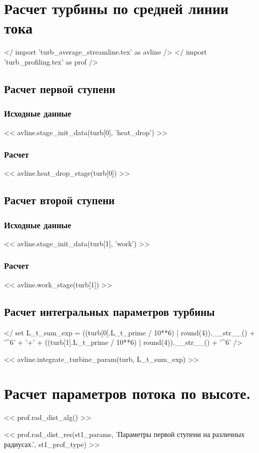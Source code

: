 \documentclass[a4paper,10pt]{article}
\begin{document}
    \section{Расчет турбины по средней линии тока}

    </ import 'turb_average_streamline.tex' as avline />
    </ import 'turb_profiling.tex' as prof />

    \subsection{Расчет первой ступени}

    \subsubsection{Исходные данные}

    << avline.stage_init_data(turb[0], 'heat_drop') >>

    \subsubsection{Расчет}

    << avline.heat_drop_stage(turb[0]) >>

    \subsection{Расчет второй ступени}

    \subsubsection{Исходные данные}

    << avline.stage_init_data(turb[1], 'work') >>

    \subsubsection{Расчет}

    << avline.work_stage(turb[1]) >>

    \subsection{Расчет интегральных параметров турбины}

    </ set L_t_sum_exp = ((turb[0].L_t_prime / 10**6) | round(4)).__str__() + '^6' + '+' +
        ((turb[1].L_t_prime / 10**6) | round(4)).__str__() + '^6' />

    << avline.integrate_turbine_param(turb, L_t_sum_exp) >>

    \section{Расчет параметров потока по высоте.}

    << prof.rad_dist_alg() >>

    << prof.rad_dist_res(st1_params, 'Параметры первой ступени на различных радиусах.', st1_prof_type) >>
\end{document}
